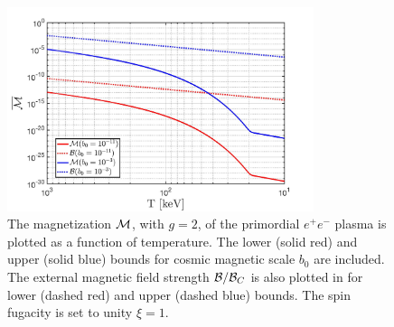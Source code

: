 \documentclass[a4paper]{article}
\begin{document}
\begin{figure}[ht]
    \centering
    \includegraphics[width=0.8\textwidth]{Magnetization_Hc_new.jpg}
    \caption{The magnetization ${\cal M}$, with $g=2$, of the primordial $e^{+}e^{-}$ plasma is plotted as a function of temperature. The lower (solid red) and upper (solid blue) bounds for cosmic magnetic scale $b_{0}$ are included. The external magnetic field strength ${\cal B}/{\cal B}_{C}$ is also plotted in for lower (dashed red) and upper (dashed blue) bounds. The spin fugacity is set to unity $\xi=1$.}
    \label{fig:magnet} 
\end{figure}
\end{document}
